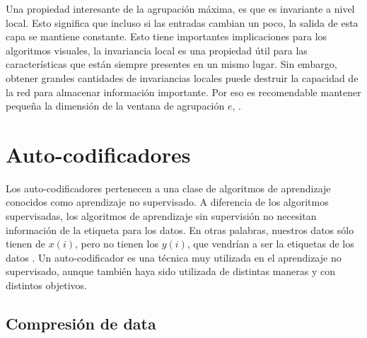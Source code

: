 	Una propiedad interesante de la agrupación máxima, es que es invariante a nivel local. Esto significa que incluso si las entradas cambian un poco, la salida de esta capa se mantiene constante. Esto tiene importantes implicaciones para los algoritmos visuales, la invariancia local es una propiedad útil para las características que están siempre presentes en un mismo lugar. Sin embargo, obtener grandes cantidades de invariancias locales puede destruir la capacidad de la red para almacenar información importante. Por eso es recomendable mantener pequeña la dimensión de la ventana de agrupación $e$, \cite{dlBook}.
	

\section{Auto-codificadores}\label{sec:autoencoders}

    Los auto-codificadores pertenecen a una clase de algoritmos de aprendizaje conocidos como aprendizaje no supervisado. A diferencia de los algoritmos supervisadas, los algoritmos de aprendizaje sin supervisión no necesitan información de la etiqueta para los datos. En otras palabras, nuestros datos sólo tienen de $x(i)$, pero no tienen los $y(i)$, que vendrían a ser la etiquetas de los datos \cite{Le15atutorial, website:UFLDL}. Un auto-codificador es una técnica muy utilizada en el aprendizaje no supervisado, aunque también haya sido utilizada de distintas maneras y con distintos objetivos.

    \subsection{Compresión de data}

